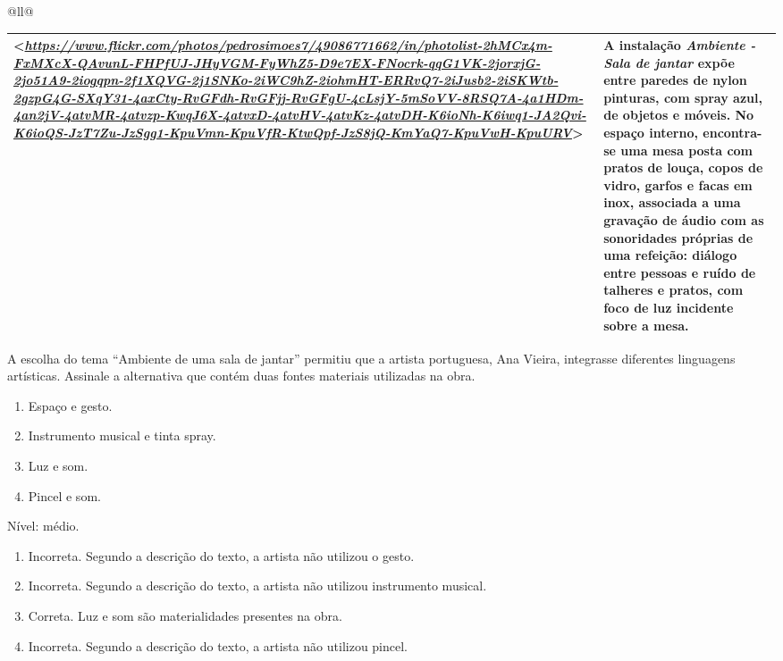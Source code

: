 \begin{itemize}
\begin{itemize}
\begin{escolha}[]{@{}ll@{}}
{{{{{{{{\begin{longtable}[]{@{}ll@{}}
\begin{minipage}[t]{0.48\columnwidth}
\textless{}\href{https://www.flickr.com/photos/pedrosimoes7/49086771662/in/photolist-2hMCx4m-FxMXcX-QAvunL-FHPfUJ-JHyVGM-FyWhZ5-D9e7EX-FNocrk-qqG1VK-2jorxjG-2jo51A9-2iogqpn-2f1XQVG-2j1SNKo-2iWC9hZ-2iohmHT-ERRvQ7-2iJusb2-2iSKWtb-2gzpG4G-SXqY31-4axCty-RvGFdh-RvGFjj-RvGFgU-4cLsjY-5mSoVV-8RSQ7A-4a1HDm-4an2jV-4atvMR-4atvzp-KwqJ6X-4atvxD-4atvHV-4atvKz-4atvDH-K6ioNh-K6iwq1-JA2Qvi-K6ioQS-JzT7Zu-JzSgg1-KpuVmn-KpuVfR-KtwQpf-JzS8jQ-KmYaQ7-KpuVwH-KpuURV}{\emph{https://www.flickr.com/photos/pedrosimoes7/49086771662/in/photolist-2hMCx4m-FxMXcX-QAvunL-FHPfUJ-JHyVGM-FyWhZ5-D9e7EX-FNocrk-qqG1VK-2jorxjG-2jo51A9-2iogqpn-2f1XQVG-2j1SNKo-2iWC9hZ-2iohmHT-ERRvQ7-2iJusb2-2iSKWtb-2gzpG4G-SXqY31-4axCty-RvGFdh-RvGFjj-RvGFgU-4cLsjY-5mSoVV-8RSQ7A-4a1HDm-4an2jV-4atvMR-4atvzp-KwqJ6X-4atvxD-4atvHV-4atvKz-4atvDH-K6ioNh-K6iwq1-JA2Qvi-K6ioQS-JzT7Zu-JzSgg1-KpuVmn-KpuVfR-KtwQpf-JzS8jQ-KmYaQ7-KpuVwH-KpuURV}}\textgreater{}\strut
\end{minipage} & \begin{minipage}[t]{0.48\columnwidth}\raggedright\strut
A instalação \emph{Ambiente - Sala de jantar} expõe entre paredes de
nylon pinturas, com spray azul, de objetos e móveis. No espaço interno,
encontra-se uma mesa posta com pratos de louça, copos de vidro, garfos e
facas em inox, associada a uma gravação de áudio com as sonoridades
próprias de uma refeição: diálogo entre pessoas e ruído de talheres e
pratos, com foco de luz incidente sobre a mesa.\strut
\end{minipage}\tabularnewline
\bottomrule
\end{longtable}

A escolha do tema ``Ambiente de uma sala de jantar'' permitiu que a
artista portuguesa, Ana Vieira, integrasse diferentes linguagens
artísticas. Assinale a alternativa que contém duas fontes materiais
utilizadas na obra.

\begin{enumerate}
\def\labelenumi{\alph{enumi})}
\item
  Espaço e gesto.
\item
  Instrumento musical e tinta spray.
\item
  Luz e som.
\item
  Pincel e som.
\end{enumerate}

Nível: médio.

\begin{enumerate}
\def\labelenumi{\alph{enumi})}
\item
  Incorreta. Segundo a descrição do texto, a artista não utilizou o
  gesto.
\item
  Incorreta. Segundo a descrição do texto, a artista não utilizou
  instrumento musical.
\item
  Correta. Luz e som são materialidades presentes na obra.
\item
  Incorreta. Segundo a descrição do texto, a artista não utilizou
  pincel.
\end{enumerate}

}}}}}}}}
\end{escolha}
\end{itemize}
\end{itemize}
